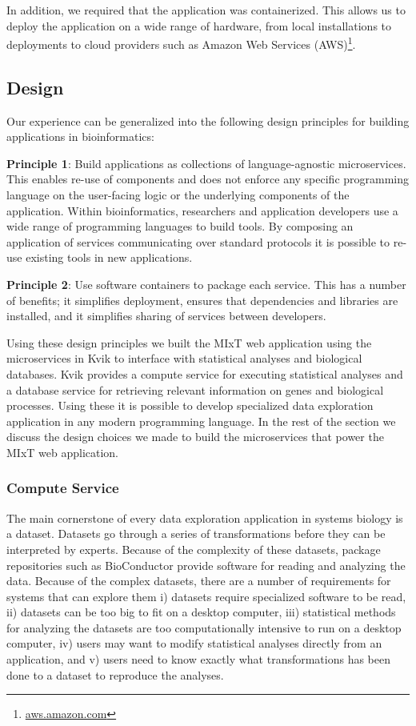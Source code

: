 In addition, we required that the application was containerized. This allows us
to deploy the application on a wide range of hardware, from local installations
to deployments to cloud providers such as Amazon Web Services
(AWS)\footnote{\url{aws.amazon.com}}. 

\subsection*{Design}
Our experience can be generalized into the following design principles for
building applications in bioinformatics: 


\textbf{Principle 1}: Build applications as collections of language-agnostic
microservices. This enables re-use of components and does not enforce any
specific programming language on the user-facing logic or the underlying
components of the application. Within bioinformatics, researchers and
application developers use a wide range of programming languages to build tools.
By composing an application of services communicating over standard protocols it
is possible to re-use existing tools in new applications. 

\textbf{Principle 2}: Use software containers to package each service. This has
a number of benefits; it simplifies deployment, ensures that dependencies and
libraries are installed, and it simplifies sharing of services between
developers. 

Using these design principles we built the MIxT web application using the
microservices in Kvik to interface with statistical analyses and biological
databases. Kvik provides a compute service for executing statistical analyses and a
database service for retrieving relevant information on genes and biological
processes.  Using these it is possible to develop specialized data exploration
application in any modern programming language.  In the rest of the section we
discuss the design choices we made to build the microservices that power the
MIxT web application. 


\subsubsection*{Compute Service}

The main cornerstone of every data exploration application in systems biology is
a dataset. Datasets go through a series of transformations before they can be
interpreted by experts. Because of the complexity of these datasets, package
repositories such as BioConductor provide software for reading and analyzing the
data. Because of the complex datasets, there are a number of requirements for
systems that can explore them
i) datasets require specialized software to be read,
ii) datasets can be too big to fit on a desktop computer,
iii) statistical methods for analyzing the datasets are too computationally
intensive to run on a desktop computer, 
iv) users may want to modify statistical analyses directly from an application, 
and 
v) users need to know exactly what transformations has been done to a dataset to
reproduce the analyses. 

